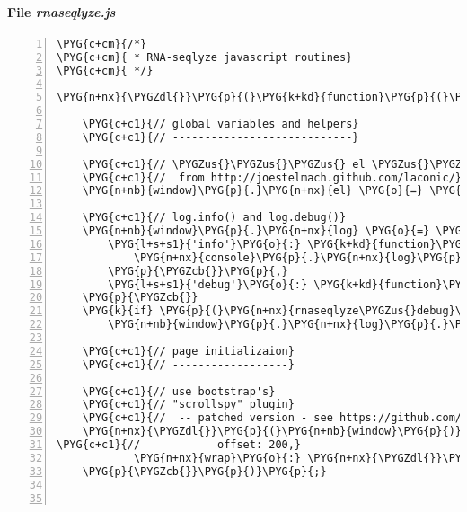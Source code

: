 \paragraph{File \emph{rnaseqlyze.js}}
\label{rnaseqlyze-pdf:file-rnaseqlyze-js}
\begin{Verbatim}[commandchars=\\\{\},numbers=left,firstnumber=1,stepnumber=5]
\PYG{c+cm}{/*}
\PYG{c+cm}{ * RNA-seqlyze javascript routines}
\PYG{c+cm}{ */}

\PYG{n+nx}{\PYGZdl{}}\PYG{p}{(}\PYG{k+kd}{function}\PYG{p}{(}\PYG{p}{)} \PYG{p}{\PYGZob{}}

    \PYG{c+c1}{// global variables and helpers}
    \PYG{c+c1}{// ----------------------------}

    \PYG{c+c1}{// \PYGZus{}\PYGZus{}\PYGZus{} el \PYGZus{}\PYGZus{}\PYGZus{}}
    \PYG{c+c1}{//  from http://joestelmach.github.com/laconic/}
    \PYG{n+nb}{window}\PYG{p}{.}\PYG{n+nx}{el} \PYG{o}{=} \PYG{n+nx}{\PYGZdl{}}\PYG{p}{.}\PYG{n+nx}{el}\PYG{p}{;}

    \PYG{c+c1}{// log.info() and log.debug()}
    \PYG{n+nb}{window}\PYG{p}{.}\PYG{n+nx}{log} \PYG{o}{=} \PYG{p}{\PYGZob{}}
        \PYG{l+s+s1}{'info'}\PYG{o}{:} \PYG{k+kd}{function}\PYG{p}{(}\PYG{p}{)} \PYG{p}{\PYGZob{}}
            \PYG{n+nx}{console}\PYG{p}{.}\PYG{n+nx}{log}\PYG{p}{.}\PYG{n+nx}{apply}\PYG{p}{(}\PYG{n+nx}{console}\PYG{p}{,} \PYG{n+nx}{arguments}\PYG{p}{)}\PYG{p}{;}
        \PYG{p}{\PYGZcb{}}\PYG{p}{,}
        \PYG{l+s+s1}{'debug'}\PYG{o}{:} \PYG{k+kd}{function}\PYG{p}{(}\PYG{p}{)} \PYG{p}{\PYGZob{}}\PYG{p}{\PYGZcb{}}
    \PYG{p}{\PYGZcb{}}
    \PYG{k}{if} \PYG{p}{(}\PYG{n+nx}{rnaseqlyze\PYGZus{}debug}\PYG{p}{)}
        \PYG{n+nb}{window}\PYG{p}{.}\PYG{n+nx}{log}\PYG{p}{.}\PYG{n+nx}{debug} \PYG{o}{=} \PYG{n+nb}{window}\PYG{p}{.}\PYG{n+nx}{log}\PYG{p}{.}\PYG{n+nx}{info}\PYG{p}{;}

    \PYG{c+c1}{// page initializaion}
    \PYG{c+c1}{// ------------------}

    \PYG{c+c1}{// use bootstrap's}
    \PYG{c+c1}{// "scrollspy" plugin}
    \PYG{c+c1}{//  -- patched version - see https://github.com/twitter/bootstrap/pull/3829}
    \PYG{n+nx}{\PYGZdl{}}\PYG{p}{(}\PYG{n+nb}{window}\PYG{p}{)}\PYG{p}{.}\PYG{n+nx}{scrollspy}\PYG{p}{(}\PYG{p}{\PYGZob{}}
\PYG{c+c1}{//            offset: 200,}
            \PYG{n+nx}{wrap}\PYG{o}{:} \PYG{n+nx}{\PYGZdl{}}\PYG{p}{(}\PYG{l+s+s1}{'\PYGZsh{}wrap'}\PYG{p}{)}\PYG{p}{[}\PYG{l+m+mi}{0}\PYG{p}{]}\PYG{p}{,}
    \PYG{p}{\PYGZcb{}}\PYG{p}{)}\PYG{p}{;}



\end{Verbatim}
